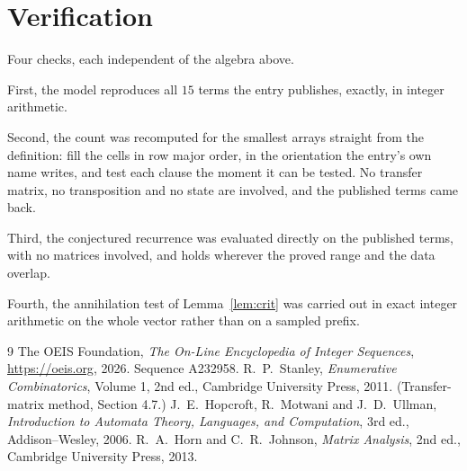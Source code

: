 \documentclass[11pt,a4paper]{article}
\theoremstyle{plain}
\theoremstyle{definition}
\begin{document}
\section{Verification}

Four checks, each independent of the algebra above.

First, the model reproduces all $15$ terms the entry publishes, exactly, in integer
arithmetic.

Second, the count was recomputed for the smallest arrays straight from the definition: fill the
cells in row major order, in the orientation the entry's own name writes, and test each clause
the moment it can be tested. No transfer matrix, no transposition and no state are involved,
and the published terms came back.

Third, the conjectured recurrence was evaluated directly on the published terms, with no
matrices involved, and holds wherever the proved range and the data overlap.

Fourth, the annihilation test of Lemma~\ref{lem:crit} was carried out in exact integer
arithmetic on the whole vector rather than on a sampled prefix.

\begin{thebibliography}{9}
 The OEIS Foundation, \emph{The On-Line Encyclopedia of Integer
Sequences}, \url{https://oeis.org}, 2026. Sequence A232958.
 R.~P.~Stanley, \emph{Enumerative Combinatorics}, Volume 1, 2nd ed.,
Cambridge University Press, 2011. (Transfer-matrix method, Section 4.7.)
 J.~E.~Hopcroft, R.~Motwani and J.~D.~Ullman, \emph{Introduction to Automata
Theory, Languages, and Computation}, 3rd ed., Addison--Wesley, 2006.
 R.~A.~Horn and C.~R.~Johnson, \emph{Matrix Analysis}, 2nd ed., Cambridge
University Press, 2013.
\end{thebibliography}
\end{document}
